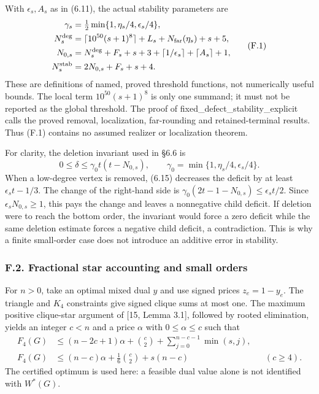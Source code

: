 \documentclass[english,11pt,a4paper]{article}
\begin{document}
With \(\epsilon_s,A_s\) as in (6.11), the actual stability parameters are \[
\begin{aligned}
\gamma_s&=\tfrac12\min\{1,\eta_s/4,\epsilon_s/4\},\\
N_s^{\rm deg}&=\lceil10^{50}(s+1)^8\rceil+L_s+
                    N_{\rm far}(\eta_s)+s+5,\\
N_{0,s}&=N_s^{\rm deg}+F_s+s+3+
                 \lceil1/\epsilon_s\rceil+\lceil A_s\rceil+1,\\
N_s^{\rm stab}&=2N_{0,s}+F_s+s+4.
\end{aligned}
\tag{F.1}
\] These are definitions of named, proved threshold functions, not numerically useful bounds. The local term \(10^{50}(s+1)^8\) is only one summand; it must not be reported as the global threshold. The proof of {\ttfamily\small fixed\_\discretionary{\hbox{\ensuremath{\hookrightarrow}}}{}{}defect\_\discretionary{\hbox{\ensuremath{\hookrightarrow}}}{}{}stability\_\discretionary{\hbox{\ensuremath{\hookrightarrow}}}{}{}explicit} calls the proved removal, localization, far-rounding and retained-terminal results. Thus (F.1) contains no assumed realizer or localization theorem.

For clarity, the deletion invariant used in §6.6 is \[
0\le\delta\le\gamma_0t(t-N_{0,s}),\qquad
\gamma_0=\min\{1,\eta_s/4,\epsilon_s/4\}.
\] When a low-degree vertex is removed, (6.15) decreases the deficit by at least \(\epsilon_s t-1/3\). The change of the right-hand side is \(\gamma_0(2t-1-N_{0,s})\le\epsilon_s t/2\). Since \(\epsilon_sN_{0,s}\ge1\), this pays the change and leaves a nonnegative child deficit. If deletion were to reach the bottom order, the invariant would force a zero deficit while the same deletion estimate forces a negative child deficit, a contradiction. This is why a finite small-order case does not introduce an additive error in stability.

\subsubsection{F.2. Fractional star accounting and small orders}\label{f.2.-fractional-star-accounting-and-small-orders}

For \(n>0\), take an optimal mixed dual \(y\) and use signed prices \(z_e=1-y_e\). The triangle and \(K_4\) constraints give signed clique sums at most one. The maximum positive clique-star argument of {[}15, Lemma 3.1{]}, followed by rooted elimination, yields an integer \(c<n\) and a price \(\alpha\) with \(0\le\alpha\le c\) such that \[
\begin{aligned}
F_4(G)&\le(n-2c+1)\alpha+\binom c2+
                \sum_{j=0}^{n-c-1}\min(s,j),\\
F_4(G)&\le(n-c)\alpha+\frac16\binom c2+s(n-c)
                   &&(c\ge4).
\end{aligned}
\tag{F.2}
\] The certified optimum is used here: a feasible dual value alone is not identified with \(W^*(G)\).
\end{document}
